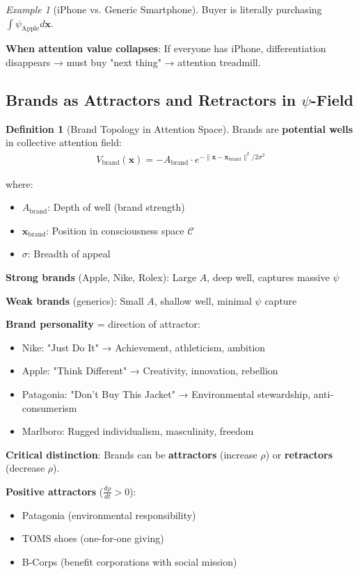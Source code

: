 \documentclass[11pt,a4paper]{article}
\theoremstyle{definition}
\newtheorem{definition}{Definition}[section]
\theoremstyle{remark}
\newtheorem{example}{Example}[section]
\newcommand{\CC}{\mathcal{C}}
\begin{document}
\begin{enumerate}
\begin{example}[iPhone vs. Generic Smartphone]
Buyer is literally purchasing \(\int \psi_{\text{Apple}} d\mathbf{x}\).

\textbf{When attention value collapses}: If everyone has iPhone, differentiation disappears → must buy "next thing" → attention treadmill.
\end{example}

\subsection{Brands as Attractors and Retractors in \(\psi\)-Field}

\begin{definition}[Brand Topology in Attention Space]
Brands are \textbf{potential wells} in collective attention field:
\begin{align}
V_{\text{brand}}(\mathbf{x}) = -A_{\text{brand}} \cdot e^{-\|\mathbf{x} - \mathbf{x}_{\text{brand}}\|^2 / 2\sigma^2}
\end{align}

where:
\begin{itemize}
    \item \(A_{\text{brand}}\): Depth of well (brand strength)
    \item \(\mathbf{x}_{\text{brand}}\): Position in consciousness space \(\CC\)
    \item \(\sigma\): Breadth of appeal
\end{itemize}

\textbf{Strong brands} (Apple, Nike, Rolex): Large \(A\), deep well, captures massive \(\psi\)

\textbf{Weak brands} (generics): Small \(A\), shallow well, minimal \(\psi\) capture

\textbf{Brand personality} = direction of attractor:
\begin{itemize}
    \item Nike: "Just Do It" → Achievement, athleticism, ambition
    \item Apple: "Think Different" → Creativity, innovation, rebellion
    \item Patagonia: "Don't Buy This Jacket" → Environmental stewardship, anti-consumerism
    \item Marlboro: Rugged individualism, masculinity, freedom
\end{itemize}

\textbf{Critical distinction}: Brands can be \textbf{attractors} (increase \(\rho\)) or \textbf{retractors} (decrease \(\rho\)).

\textbf{Positive attractors} (\(\frac{d\rho}{dt} > 0\)):
\begin{itemize}
    \item Patagonia (environmental responsibility)
    \item TOMS shoes (one-for-one giving)
    \item B-Corps (benefit corporations with social mission)
\end{itemize}


\end{definition}
\end{enumerate}
\end{document}

